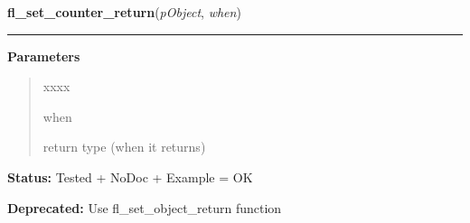     \label{xformslib:deprecated:fl_set_counter_return}

    \vspace{0.5ex}

\hspace{.8\funcindent}\begin{boxedminipage}{\funcwidth}

    \raggedright \textbf{fl\_set\_counter\_return}(\textit{pObject}, \textit{when})

    \vspace{-1.5ex}

    \rule{\textwidth}{0.5\fboxrule}
\setlength{\parskip}{2ex}
\setlength{\parskip}{1ex}
      \textbf{Parameters}
      \vspace{-1ex}

      \begin{quote}
        \begin{Ventry}{xxxx}

          \item[when]

          return type (when it returns)

        \end{Ventry}

      \end{quote}

\textbf{Status:} Tested + NoDoc + Example = OK



\textbf{Deprecated:} Use fl\_set\_object\_return function



    \end{boxedminipage}

    \label{xformslib:deprecated:fl_add_menu}

    \vspace{0.5ex}

